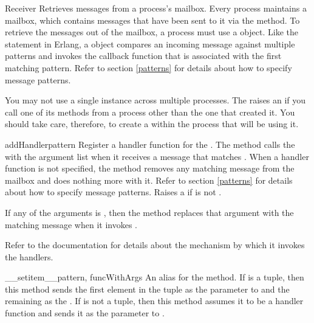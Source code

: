 \documentclass{howto}
\begin{document}
\begin{classdesc}{Receiver}{}
Retrieves messages from a process's mailbox. Every process maintains a mailbox,
which contains messages that have been sent to it via the 
method. To retrieve the messages out of the mailbox, a process must use a
 object. Like the  statement in Erlang, a
 object compares an incoming message against multiple patterns
and invokes the callback function that is associated with the first matching
pattern. Refer to section \ref{patterns} for details about how to specify
message patterns.

\begin{notice}[warning]
You may not use a single  instance across multiple processes.
The  raises an  if you call one
of its methods from a process other than the one that created it. You should
take care, therefore, to create a  within the process that will
be using it.
\end{notice}

\begin{methoddesc}{addHandler}{pattern}
Register a handler function  for the . The
 method calls the  with the  argument
list when it receives a message that matches . When a handler
function  is not specified, the  method removes any
matching message from the mailbox and does nothing more with it. Refer to
section \ref{patterns} for details about how to specify message patterns. Raises
a   if  is not
.

If any of the  arguments is , then the
 method replaces that argument with the matching message when
it invokes .

Refer to the  documentation for details about the
mechanism by which it invokes the handlers.
\end{methoddesc}

\begin{methoddesc}{__setitem__}{pattern, funcWithArgs}
\opindex{[]}
An alias for the  method. If  is a tuple,
then this method sends the first element in the tuple as the 
parameter to  and the remaining as the . If
 is not a tuple, then this method assumes it to be a handler
function and sends it as the  parameter to .


\end{methoddesc}
\end{classdesc}
\end{document}
